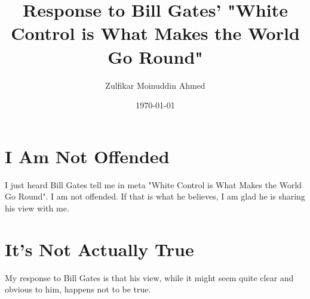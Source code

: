 \documentclass{amsart}
\title{Response to Bill Gates' "White Control is What Makes the World Go Round"}
\author{Zulfikar Moinuddin Ahmed}
\date{\today}
\begin{document}
\maketitle

\section{I Am Not Offended}

I just heard Bill Gates tell me in meta "White Control is What Makes the World Go Round".  I am not offended.  If that is what he believes, I am glad he is sharing his view with me.

\section{It's Not Actually True}

My response to Bill Gates is that his view, while it might seem quite clear and obvious to him, happens not to be true.
\end{document}
